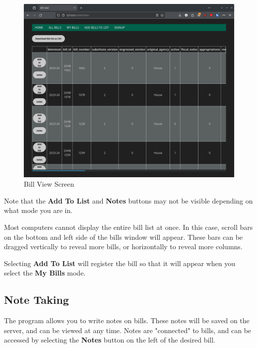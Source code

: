 \documentclass{article}
\begin{document}
\begin{figure}[H]
\includegraphics[width=\textwidth]{billview.png}
\caption{Bill View Screen}
\label{fig:billview}
\end{figure}

Note that the \textbf{Add To List} and \textbf{Notes} buttons may not be visible depending on what mode you are in. 

Most computers cannot display the entire bill list at once. In this case, scroll bars on the bottom and left side of the bills window will appear. These bars can be dragged vertically to reveal more bills, or horizontally to reveal more columns.

Selecting \textbf{Add To List} will register the bill so that it will appear when you select the \textbf{My Bills} mode.

\subsection{Note Taking}

The program allows you to write notes on bills. These notes will be saved on the server, and can be viewed at any time. Notes are "connected" to bills, and can be accessed by selecting the \textbf{Notes} button on the left of the desired bill.
\end{document}
